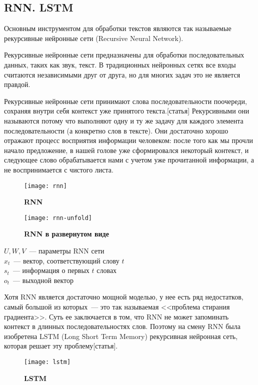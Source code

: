 \subsection{RNN. LSTM}
Основным инструментом для обработки текстов являются так называемые рекурсивные нейронные сети (Recursive Neural Network).

Рекурсивные нейронные сети предназначены для обработки последовательных данных, таких как звук, текст. В традиционных нейронных сетях все входы считаются независимыми друг от друга, но для многих задач это не является правдой.

Рекурсивные нейронные сети принимают слова последовательности поочереди, сохраняя внутри себя контекст уже принятого текста.[статья] Рекурсивными они называются потому что выполняют одну и ту же задачу для каждого элемента последовательности (а конкретно слов в тексте). Они достаточно хорошо отражают процесс восприятия информации человеком: после того как мы прочли начало предложение, в нашей голове уже сформировался некоторый контекст, и следующее слово обрабатывается нами с учетом уже прочитанной информации, а не воспринимается с чистого листа.

\begin{figure}[h]
\texttt{[image: rnn]}
\caption{\textbf{RNN}}
\label{fig:rnn}
\end{figure}

\begin{figure}[h]
\texttt{[image: rnn-unfold]}
\caption{\textbf{RNN в развернутом виде}}
\label{fig:rnn-unfold}
\end{figure}

\noindent $U, W, V$~--- параметры RNN сети\\
$x_t$~--- вектор, соответствующий слову $t$ \\
$s_t$~--- информация о первых $t$ словах \\
$o_t$~--- выходной вектор

Хотя RNN является достаточно мощной моделью, у нее есть ряд недостатков, самый большой из которых~--- это так называемая <<проблема стирания градиента>>. Суть ее заключается в том, что RNN не может запоминать контекст в длинных последовательностях слов. Поэтому на смену RNN была изобретена LSTM (Long Short Term Memory) рекурсивная нейронная сеть, которая решает эту проблему[статья].

\begin{figure}[h]
\texttt{[image: lstm]}
\caption{\textbf{LSTM}}
\label{fig:lstm}
\end{figure}

